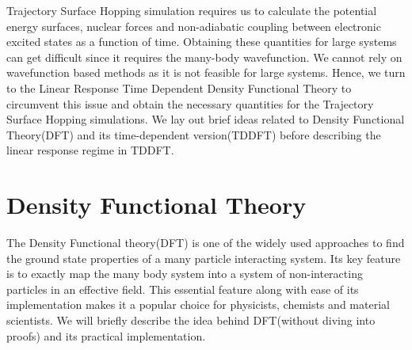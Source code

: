 Trajectory Surface Hopping simulation requires us to calculate the potential energy surfaces, nuclear forces and non-adiabatic coupling between electronic excited states as a function of time. Obtaining these quantities for large systems can get difficult since it requires the many-body wavefunction. We cannot rely on wavefunction based methods as it is not feasible for large systems. Hence, we turn to the Linear Response Time Dependent Density Functional Theory to circumvent this issue and obtain the necessary quantities for the Trajectory Surface Hopping simulations. We lay out brief ideas related to Density Functional Theory(DFT) and its time-dependent version(TDDFT) before describing the linear response regime in TDDFT. 
\section{Density Functional Theory}

The Density Functional theory(DFT) is one of the widely used approaches to find the ground state properties of a many particle interacting system. Its key feature is to exactly map the many body system into a system of non-interacting particles in an effective field. This essential feature along with ease of its implementation makes it a popular choice for physicists, chemists and material scientists. We will briefly describe the idea behind DFT(without diving into proofs) and its practical implementation.

